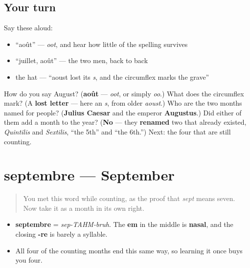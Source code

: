 \subsection*{Your turn}
Say these aloud:

\begin{itemize}
\raggedright
  \item \textquotedblleft{}août\textquotedblright{} — \emph{oot}, and hear how little of the spelling survives
  \item \textquotedblleft{}juillet, août\textquotedblright{} — the two men, back to back
  \item the hat — \textquotedblleft{}aoust lost its \emph{s}, and the circumflex marks the grave\textquotedblright{}
\end{itemize}

\begin{tcolorbox}[breakable,colback=teal!4,colframe=teal!35!black,title={Before you move on}]
How do you say August? (\textbf{août} — \emph{oot}, or simply \emph{oo}.) What does the circumflex mark? (A \textbf{lost letter} — here an \emph{s}, from older \emph{aoust}.) Who are the two months named for people? (\textbf{Julius Caesar} and the emperor \textbf{Augustus}.) Did either of them add a month to the year? (\textbf{No} — they \textbf{renamed} two that already existed, \emph{Quintilis} and \emph{Sextilis}, \textquotedblleft{}the 5th\textquotedblright{} and \textquotedblleft{}the 6th.\textquotedblright{}) Next: the four that are still counting.
\end{tcolorbox}
\section[septembre]{septembre — September}

\label{lesson:FR-C09-septembre}



\begin{quote}
You met this word while counting, as the proof that \emph{sept} means seven. Now take it as a month in its own right.
\end{quote}

\begin{sounds}
\begin{itemize}
\raggedright
  \item \textbf{septembre} = \emph{sep-TAHM-bruh}. The \textbf{em} in the middle is \textbf{nasal}, and the closing \textbf{-re} is barely a syllable.
  \item All four of the counting months end this same way, so learning it once buys you four.
\end{itemize}
\end{sounds}


